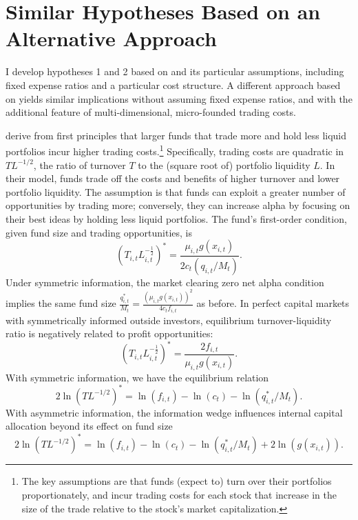 \documentclass[]{book}
\let\rmarkdownfootnote\footnote%
\def\footnote{\protect\rmarkdownfootnote}
\theoremstyle{definition}
\theoremstyle{definition}
\theoremstyle{definition}
\theoremstyle{remark}
\begin{document}
\hypertarget{similar-hypotheses-based-on-an-alternative-approach}{%
\section{Similar Hypotheses Based on an Alternative
Approach}\label{similar-hypotheses-based-on-an-alternative-approach}}

I develop hypotheses 1 and 2 based on \citet{bg04} and its particular
assumptions, including fixed expense ratios and a particular cost
structure. A different approach based on \citet{pst17L} yields similar
implications without assuming fixed expense ratios, and with the
additional feature of multi-dimensional, micro-founded trading costs.

\citet{pst17L} derive from first principles that larger funds that trade
more and hold less liquid portfolios incur higher trading
costs.\footnote{The key assumptions are that funds (expect to) turn over
  their portfolios proportionately, and incur trading costs for each
  stock that increase in the size of the trade relative to the stock's
  market capitalization.} Specifically, trading costs are quadratic in
\(TL^{-1/2}\), the ratio of turnover \(T\) to the (square root of)
portfolio liquidity \(L\). In their model, funds trade off the costs and
benefits of higher turnover and lower portfolio liquidity. The
assumption is that funds can exploit a greater number of opportunities
by trading more; conversely, they can increase alpha by focusing on
their best ideas by holding less liquid portfolios. The fund's
first-order condition, given fund size and trading opportunities, is
\begin{equation}
(T_{i,t}L_{i,t}^{-\frac{1}{2}})^\ast = \frac{\mu_{i,t}g(x_{i,t})}{2c_t(q_{i,t}/M_t)}.
\label{eq:PSTfoc}
\end{equation} Under symmetric information, the market clearing zero net
alpha condition implies the same fund size
\(\frac{q_{i,t}^\ast}{M_t}=\frac{(\mu_{i,t}g(x_{i,t}))^2}{4c_t f_{i,t}}\)
as before. In perfect capital markets with symmetrically informed
outside investors, equilibrium turnover-liquidity ratio is negatively
related to profit opportunities: \begin{equation}
(T_{i,t}L_{i,t}^{-\frac{1}{2}})^\ast=\frac{2f_{i,t}}{\mu_{i,t}g(x_{i,t})}.
\label{eq:PSTcapMkt}
\end{equation} With symmetric information, we have the equilibrium
relation \begin{equation}
2\ln(TL^{-1/2})^\ast=\ln(f_{i,t}) - \ln(c_t) - \ln(q^\ast_{i,t}/M_t).
\label{eq:csEqTL}
\end{equation} With asymmetric information, the information wedge
influences internal capital allocation beyond its effect on fund size
\begin{equation}
2\ln(TL^{-1/2})^\ast=\ln(f_{i,t}) - \ln(c_t) - \ln(q^\ast_{i,t}/M_t)+2\ln(g(x_{i,t})).
\label{eq:csEqaTL}
\end{equation}
\end{document}
